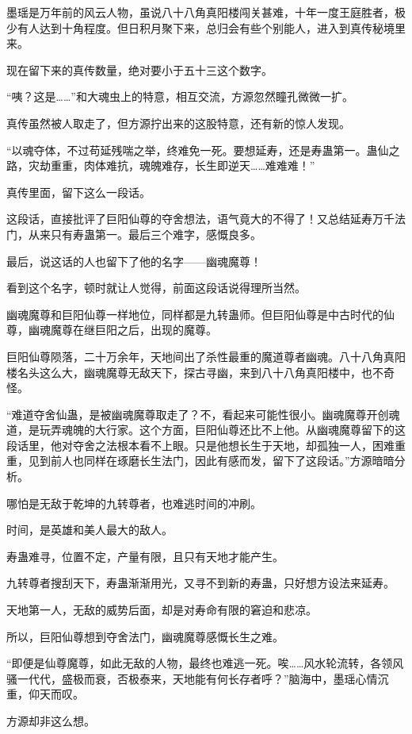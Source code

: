 \begin{this_body}
墨瑶是万年前的风云人物，虽说八十八角真阳楼闯关甚难，十年一度王庭胜者，极少有人达到十角程度。但日积月聚下来，总归会有些个别能人，进入到真传秘境里来。

现在留下来的真传数量，绝对要小于五十三这个数字。

“咦？这是……”和大魂虫上的特意，相互交流，方源忽然瞳孔微微一扩。

真传虽然被人取走了，但方源拧出来的这股特意，还有新的惊人发现。

“以魂夺体，不过苟延残喘之举，终难免一死。要想延寿，还是寿蛊第一。蛊仙之路，灾劫重重，肉体难抗，魂魄难存，长生即逆天……难难难！”

真传里面，留下这么一段话。

这段话，直接批评了巨阳仙尊的夺舍想法，语气竟大的不得了！又总结延寿万千法门，从来只有寿蛊第一。最后三个难字，感慨良多。

最后，说这话的人也留下了他的名字——幽魂魔尊！

看到这个名字，顿时就让人觉得，前面这段话说得理所当然。

幽魂魔尊和巨阳仙尊一样地位，同样都是九转蛊师。但巨阳仙尊是中古时代的仙尊，幽魂魔尊在继巨阳之后，出现的魔尊。

巨阳仙尊陨落，二十万余年，天地间出了杀性最重的魔道尊者幽魂。八十八角真阳楼名头这么大，幽魂魔尊无敌天下，探古寻幽，来到八十八角真阳楼中，也不奇怪。

“难道夺舍仙蛊，是被幽魂魔尊取走了？不，看起来可能性很小。幽魂魔尊开创魂道，是玩弄魂魄的大行家。这个方面，巨阳仙尊还比不上他。从幽魂魔尊留下的这段话里，他对夺舍之法根本看不上眼。只是他想长生于天地，却孤独一人，困难重重，见到前人也同样在琢磨长生法门，因此有感而发，留下了这段话。”方源暗暗分析。

哪怕是无敌于乾坤的九转尊者，也难逃时间的冲刷。

时间，是英雄和美人最大的敌人。

寿蛊难寻，位置不定，产量有限，且只有天地才能产生。

九转尊者搜刮天下，寿蛊渐渐用光，又寻不到新的寿蛊，只好想方设法来延寿。

天地第一人，无敌的威势后面，却是对寿命有限的窘迫和悲凉。

所以，巨阳仙尊想到夺舍法门，幽魂魔尊感慨长生之难。

“即便是仙尊魔尊，如此无敌的人物，最终也难逃一死。唉……风水轮流转，各领风骚一代代，盛极而衰，否极泰来，天地能有何长存者呼？”脑海中，墨瑶心情沉重，仰天而叹。

方源却非这么想。


\end{this_body}
